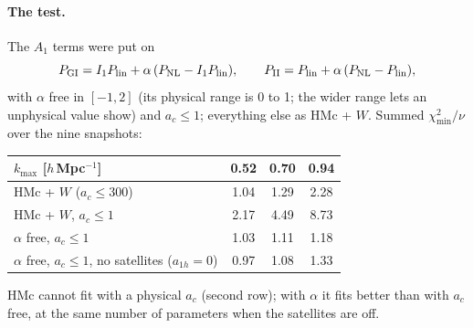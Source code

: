\documentclass[11pt]{article}
\newcommand{\kmax}{k_{\max}}
\newcommand{\PNL}{P_{\rm NL}}
\newcommand{\Plin}{P_{\rm lin}}
\begin{document}
\paragraph{The test.} The $A_1$ terms were put on
\begin{equation}
P_{\rm GI} = I_1\Plin + \alpha\,(\PNL - I_1\Plin),\qquad
P_{\rm II} = \Plin + \alpha\,(\PNL - \Plin),
\end{equation}
with $\alpha$ free in $[-1, 2]$ (its physical range is 0 to 1; the wider range
lets an unphysical value show) and $a_c \le 1$; everything else as HMc + $W$.
Summed $\chi^2_{\min}/\nu$ over the nine snapshots:
\begin{center}\small
\begin{tabular}{lccc}\toprule
$\kmax$ [$h\,$Mpc$^{-1}$] & 0.52 & 0.70 & 0.94\\ \midrule
HMc + $W$ ($a_c \le 300$) & 1.04 & 1.29 & 2.28\\
HMc + $W$, $a_c \le 1$ & 2.17 & 4.49 & 8.73\\
$\alpha$ free, $a_c \le 1$ & 1.03 & 1.11 & 1.18\\
$\alpha$ free, $a_c \le 1$, no satellites ($a_{1h} = 0$) & 0.97 & 1.08 & 1.33\\
\bottomrule\end{tabular}
\end{center}
HMc cannot fit with a physical $a_c$ (second row); with $\alpha$ it fits
better than with $a_c$ free, at the same number of parameters when the
satellites are off.
\end{document}
